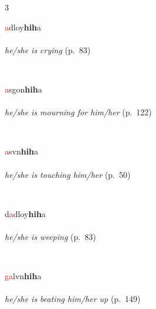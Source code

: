 \documentclass[oneside,openany]{book}%
\begin{document}
\noindent\begin{multicols}{3}%
\begin{minipage}[t]{\linewidth}
\raggedright\noindent \textcolor{Red}{a}dloy\textbf{hih}a\\
\\
\noindent \textit{he/she is crying} (p.~83)
\end{minipage}\\[1em]%
\begin{minipage}[t]{\linewidth}
\raggedright\noindent \textcolor{Red}{a}sgon\textbf{hih}a\\
\\
\noindent \textit{he/she is mourning for him/her} (p.~122)
\end{minipage}\\[1em]%
\begin{minipage}[t]{\linewidth}
\raggedright\noindent \textcolor{Red}{a}svn\textbf{hih}a\\
\\
\noindent \textit{he/she is touching him/her} (p.~50)
\end{minipage}\\[1em]%
\begin{minipage}[t]{\linewidth}
\raggedright\noindent d\textcolor{Red}{a}dloy\textbf{hih}a\\
\\
\noindent \textit{he/she is weeping} (p.~83)
\end{minipage}\\[1em]%
\begin{minipage}[t]{\linewidth}
\raggedright\noindent \textcolor{Red}{ga}lvn\textbf{hih}a\\
\\
\noindent \textit{he/she is beating him/her up} (p.~149)
\end{minipage}\\[1em]%
\end{multicols}%
\vspace{1em}%
\needspace{1.5in}%
\end{document}
